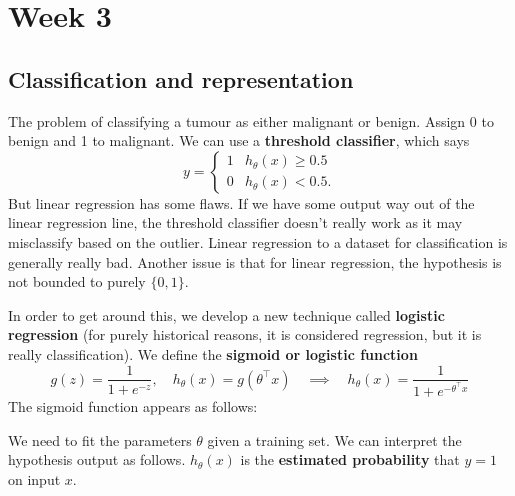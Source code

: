 \documentclass[a4paper, 10pt, oneside]{book}
\begin{document}
\chapter{Week 3}

\section{Classification and representation}

The problem of classifying a tumour as either malignant or benign. Assign 0 to benign and 1 to malignant. We can use a \textbf{threshold classifier}, which says
\[y = \begin{cases}
 1 & h_\theta(x) \geq 0.5 \\
 0 &  h_\theta(x) < 0.5.	
 \end{cases}
\]
But linear regression has some flaws. If we have some output way out of the linear regression line, the threshold classifier doesn't really work as it may misclassify based on the outlier. Linear regression to a dataset for classification is generally really bad. Another issue is that for linear regression, the hypothesis is not bounded to purely $\{0,1\}$.

In order to get around this, we develop a new technique called \textbf{logistic regression} (for purely historical reasons, it is considered regression, but it is really classification). We define the \textbf{sigmoid or logistic function}
\[g(z) = \frac{1}{1 + e^{-z}}, \quad h_\theta (x) = g(\theta^\top x) \quad \implies \quad h_\theta(x) = \frac{1}{1 + e^{-\theta^\top x}}\]
The sigmoid function appears as follows: 

\begin{figure}[H]
\centering	
{}
\end{figure}

We need to fit the parameters $\theta$ given a training set. We can interpret the hypothesis output as follows. $h_\theta(x)$ is the \textbf{estimated probability} that $y=1$ on input $x$. 
\end{document}
